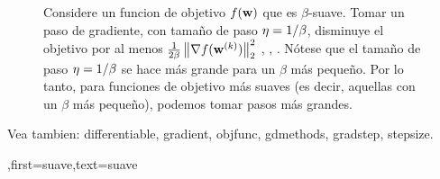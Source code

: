 {{\begin{figure}[H]
\begin{center}
				\end{center}
				\caption{Considere un funcion de objetivo $f({\bf w})$ que es $\beta$-suave. 
					Tomar un paso de gradiente, con tamaño de paso $\eta = 1/\beta$, disminuye el 
					objetivo por al menos $\frac{1}{2\beta}\left\Vert {\nabla f({\bf w}^{(k)})} \right\Vert_{2}^{2}$ \cite{nesterov04}, \cite{CvxBubeck2015}, \cite{CvxAlgBertsekas}. 
					Nótese que el tamaño de paso $\eta = 1/\beta$ se hace más grande para un $\beta$ más pequeño. Por lo tanto, 
					para funciones de objetivo más suaves (es decir, aquellas con un $\beta$ más pequeño), 
					podemos tomar pasos más grandes. \label{fig_gd_smooth_dict}}
				\end{figure}
				Vea tambien: \gls{differentiable}, \gls{gradient}, \gls{objfunc}, \gls{gdmethods}, \gls{gradstep}, \gls{stepsize}.
			},first={suave},text={suave}}

